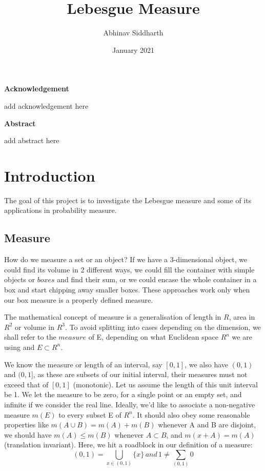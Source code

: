 \documentclass{article}
\title{\textbf{Lebesgue Measure}}
\author{Abhinav Siddharth}
\date{January 2021}
\begin{document}
\maketitle

\newpage
\begin{center}
    {\Large\bfseries\noindent Acknowledgement}
\end{center}


add acknowledgement here

\newpage

\begin{center}
    {\Large\bfseries\noindent Abstract}
\end{center}

add abstract here
\newpage

\begin{center}
    \tableofcontents
\end{center}

\newpage

\section{Introduction}
The goal of this project is to investigate the Lebesgue measure and some of its applications in probability measure. 

\subsection{Measure}

How do we measure a set or an object? If we have a 3-dimensional object, we could find its volume in 2 different ways, we could fill the container with simple objects or $boxes$ and find their sum, or we could encase the whole container in a box and start chipping away smaller boxes. These approaches work only when our box measure is a properly defined measure. 

The mathematical concept of measure is a generalisation of length in $R$, area in $R^2$ or volume in $R^3$. To avoid splitting into cases depending on the dimension, we shall refer to the $measure$ of E, depending on what Euclidean space $R^n$ we are using and $E \subset R^n$.

We know the measure or length of an interval, say $[0,1]$, we also have $(0,1)$ and $(0,1]$, as these are subsets of our initial interval, their measures must not exceed that of $[0,1]$ (monotonic). Let us assume the length of this unit interval be 1. We let the measure to be zero, for a single point or an empty set, and infinite if we consider the real line. Ideally, we'd like to associate a non-negative measure $m(E)$ to every subset E of $R^n$. It should also obey some reasonable properties like $m(A \cup B) = m(A) + m(B)$ whenever A and B are disjoint, we should have $m(A) \leq m(B)$ whenever $A \subset B$, and $m(x+A)=m(A)$ (translation invariant). Here, we hit a roadblock in our definition of a measure:
$$(0,1)= \bigcup_{x \in (0,1)} \{x\} \, and \, 1 \neq \sum_{(0,1)}0$$
\end{document}
